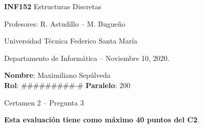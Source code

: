 \documentclass[legalpaper,10pt]{article}
\begin{document}
\thispagestyle{empty}

\begin{minipage}[t]{0.6\textwidth}

{\LARGE \textbf{INF152} Estructuras Discretas}

{\large Profesores: R. Astudillo -- M. Bugueño}

Universidad Técnica Federico Santa María

Departamento de Informática -- Noviembre 10, 2020.

\end{minipage}
\hfill
\begin{minipage}[t]{0.35\textwidth}
\textbf{Nombre}: Maximiliano Sepúlveda\\[0.3cm]
\textbf{Rol}: #########-# \textbf{Paralelo}: 200
\end{minipage}

\vspace{0.8cm}

{\Large Certamen 2 -- Pregunta 3}

\vspace{0.4cm}

\textbf{Esta evaluación tiene como máximo 40 puntos del C2}.
\end{document}
